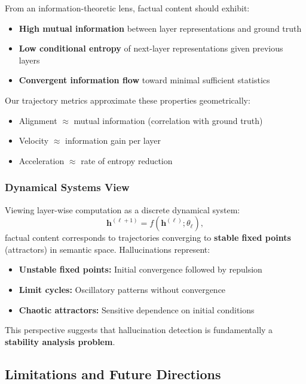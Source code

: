 \documentclass[11pt]{article}
\begin{document}
From an information-theoretic lens, factual content should exhibit:
\begin{itemize}[leftmargin=*]
    \item \textbf{High mutual information} between layer representations and ground truth
    \item \textbf{Low conditional entropy} of next-layer representations given previous layers
    \item \textbf{Convergent information flow} toward minimal sufficient statistics
\end{itemize}

Our trajectory metrics approximate these properties geometrically:
\begin{itemize}[leftmargin=*]
    \item Alignment $\approx$ mutual information (correlation with ground truth)
    \item Velocity $\approx$ information gain per layer
    \item Acceleration $\approx$ rate of entropy reduction
\end{itemize}

\subsubsection{Dynamical Systems View}

Viewing layer-wise computation as a discrete dynamical system:
\[
\mathbf{h}^{(\ell+1)} = f(\mathbf{h}^{(\ell)}; \theta_{\ell}),
\]
factual content corresponds to trajectories converging to \textbf{stable fixed points} (attractors) in semantic space. Hallucinations represent:
\begin{itemize}[leftmargin=*]
    \item \textbf{Unstable fixed points:} Initial convergence followed by repulsion
    \item \textbf{Limit cycles:} Oscillatory patterns without convergence
    \item \textbf{Chaotic attractors:} Sensitive dependence on initial conditions
\end{itemize}

This perspective suggests that hallucination detection is fundamentally a \textbf{stability analysis problem}.

\subsection{Limitations and Future Directions}
\end{document}

